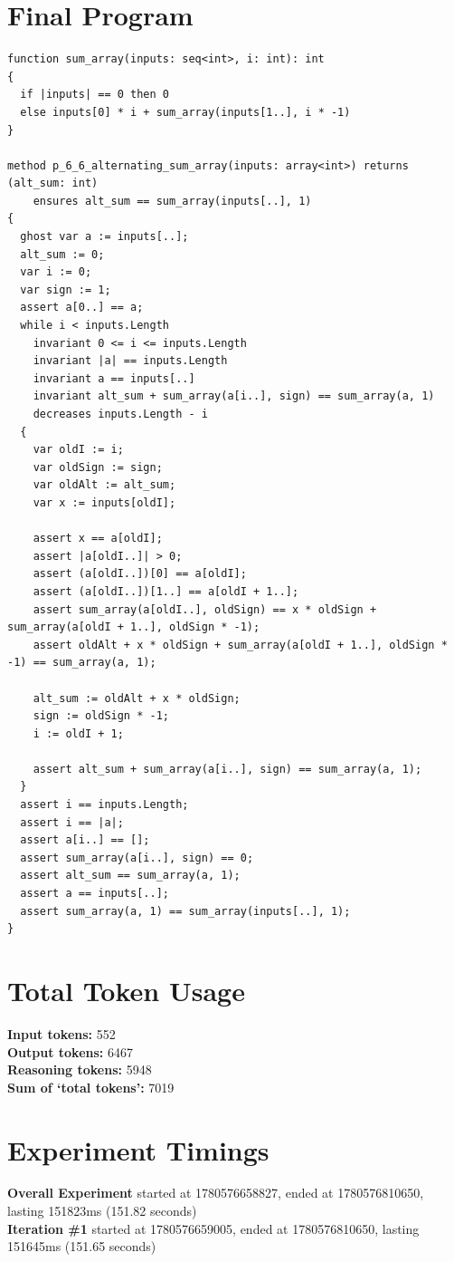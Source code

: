 \documentclass{article}
\begin{document}
\section*{Final Program}
\begin{lstlisting}
function sum_array(inputs: seq<int>, i: int): int
{
  if |inputs| == 0 then 0
  else inputs[0] * i + sum_array(inputs[1..], i * -1)
}

method p_6_6_alternating_sum_array(inputs: array<int>) returns (alt_sum: int)
	ensures alt_sum == sum_array(inputs[..], 1)
{
  ghost var a := inputs[..];
  alt_sum := 0;
  var i := 0;
  var sign := 1;
  assert a[0..] == a;
  while i < inputs.Length
    invariant 0 <= i <= inputs.Length
    invariant |a| == inputs.Length
    invariant a == inputs[..]
    invariant alt_sum + sum_array(a[i..], sign) == sum_array(a, 1)
    decreases inputs.Length - i
  {
    var oldI := i;
    var oldSign := sign;
    var oldAlt := alt_sum;
    var x := inputs[oldI];

    assert x == a[oldI];
    assert |a[oldI..]| > 0;
    assert (a[oldI..])[0] == a[oldI];
    assert (a[oldI..])[1..] == a[oldI + 1..];
    assert sum_array(a[oldI..], oldSign) == x * oldSign + sum_array(a[oldI + 1..], oldSign * -1);
    assert oldAlt + x * oldSign + sum_array(a[oldI + 1..], oldSign * -1) == sum_array(a, 1);

    alt_sum := oldAlt + x * oldSign;
    sign := oldSign * -1;
    i := oldI + 1;

    assert alt_sum + sum_array(a[i..], sign) == sum_array(a, 1);
  }
  assert i == inputs.Length;
  assert i == |a|;
  assert a[i..] == [];
  assert sum_array(a[i..], sign) == 0;
  assert alt_sum == sum_array(a, 1);
  assert a == inputs[..];
  assert sum_array(a, 1) == sum_array(inputs[..], 1);
}
\end{lstlisting}
\section*{Total Token Usage}
\textbf{Input tokens: }552
\\\textbf{Output tokens: }6467
\\\textbf{Reasoning tokens: }5948
\\\textbf{Sum of `total tokens': }7019
\section*{Experiment Timings}
\textbf{Overall Experiment} started at 1780576658827, ended at 1780576810650, lasting 151823ms (151.82 seconds)
\\\textbf{Iteration \#1} started at 1780576659005, ended at 1780576810650, lasting 151645ms (151.65 seconds)
\end{document}
